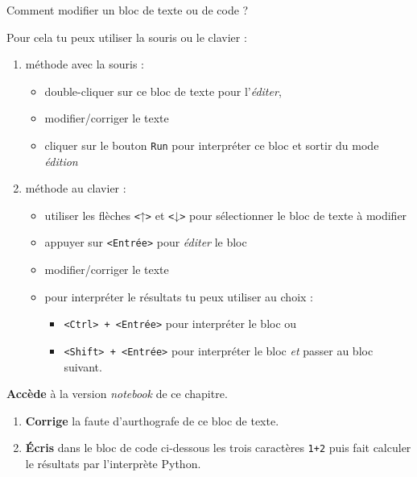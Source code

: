 \documentclass[a4paper,17pt]{extarticle}
\providecommand{\tightlist}{%
      \setlength{\itemsep}{0pt}\setlength{\parskip}{0pt}}
\begin{document}
    Comment modifier un bloc de texte ou de code ?

Pour cela tu peux utiliser la souris ou le clavier :

\begin{enumerate}
\def\labelenumi{\arabic{enumi}.}
\tightlist
\item
  méthode avec la souris :

  \begin{itemize}
  \tightlist
  \item
    double-cliquer sur ce bloc de texte pour l'\emph{éditer},
  \item
    modifier/corriger le texte
  \item
    cliquer sur le bouton \texttt{Run} pour interpréter ce bloc et
    sortir du mode \emph{édition}
  \end{itemize}
\item
  méthode au clavier :

  \begin{itemize}
  \tightlist
  \item
    utiliser les flèches \texttt{\textless{}}↑\texttt{\textgreater{}} et
    \texttt{\textless{}}↓\texttt{\textgreater{}} pour sélectionner le
    bloc de texte à modifier
  \item
    appuyer sur \texttt{\textless{}Entrée\textgreater{}} pour
    \emph{éditer} le bloc
  \item
    modifier/corriger le texte
  \item
    pour interpréter le résultats tu peux utiliser au choix :

    \begin{itemize}
    \tightlist
    \item
      \texttt{\textless{}Ctrl\textgreater{}\ +\ \textless{}Entrée\textgreater{}}
      pour interpréter le bloc ou
    \item
      \texttt{\textless{}Shift\textgreater{}\ +\ \textless{}Entrée\textgreater{}}
      pour interpréter le bloc \emph{et} passer au bloc suivant.
    \end{itemize}
  \end{itemize}
\end{enumerate}

    \textbf{Accède} à la version \emph{notebook} de ce chapitre.

\begin{enumerate}
\def\labelenumi{\arabic{enumi}.}
\tightlist
\item
  \textbf{Corrige} la faute d'aurthografe de ce bloc de texte.
\item
  \textbf{Écris} dans le bloc de code ci-dessous les trois caractères
  \texttt{1+2} puis fait calculer le résultats par l'interprète Python.
\end{enumerate}
\end{document}
